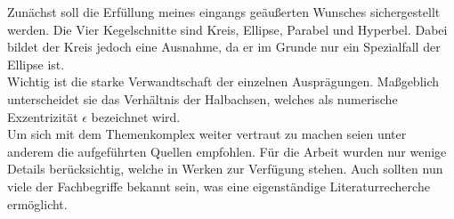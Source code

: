Zunächst soll die Erfüllung meines eingangs geäußerten Wunsches sichergestellt werden. Die Vier Kegelschnitte sind Kreis, Ellipse, Parabel und Hyperbel. Dabei bildet der Kreis jedoch eine Ausnahme, da er im Grunde nur ein Spezialfall der Ellipse ist.\\
Wichtig ist die starke Verwandtschaft der einzelnen Ausprägungen. Maßgeblich unterscheidet sie das Verhältnis der Halbachsen, welches als numerische Exzentrizität $\epsilon$ bezeichnet wird.\\
Um sich mit dem Themenkomplex weiter vertraut zu machen seien unter anderem die aufgeführten Quellen empfohlen. Für die Arbeit wurden nur wenige Details berücksichtig, welche in Werken zur Verfügung stehen. Auch sollten nun viele der Fachbegriffe bekannt sein, was eine eigenständige Literaturrecherche ermöglicht.